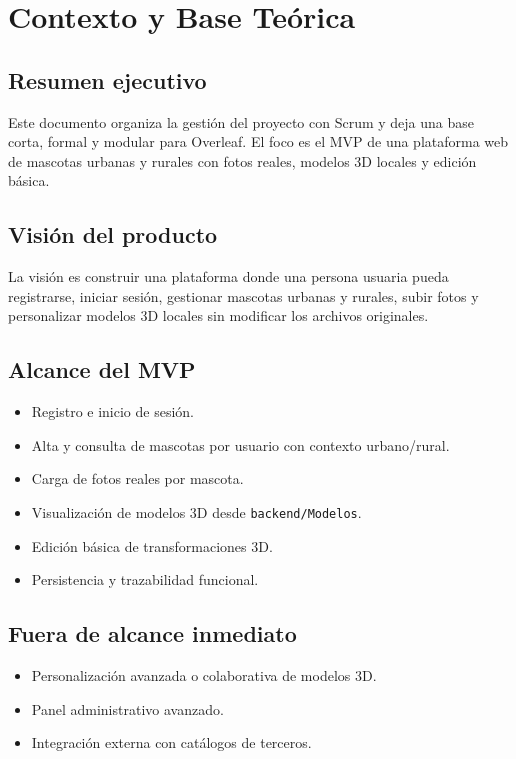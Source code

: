 \section{Contexto y Base Te\'orica}
\subsection{Resumen ejecutivo}
Este documento organiza la gesti\'on del proyecto con Scrum y deja una base corta, formal y modular para Overleaf. El foco es el MVP de una plataforma web de mascotas urbanas y rurales con fotos reales, modelos 3D locales y edici\'on b\'asica.

\subsection{Visi\'on del producto}
La visi\'on es construir una plataforma donde una persona usuaria pueda registrarse, iniciar sesi\'on, gestionar mascotas urbanas y rurales, subir fotos y personalizar modelos 3D locales sin modificar los archivos originales.

\subsection{Alcance del MVP}
\begin{itemize}[leftmargin=*]
    \item Registro e inicio de sesi\'on.
    \item Alta y consulta de mascotas por usuario con contexto urbano/rural.
    \item Carga de fotos reales por mascota.
    \item Visualizaci\'on de modelos 3D desde \texttt{backend/Modelos}.
    \item Edici\'on b\'asica de transformaciones 3D.
    \item Persistencia y trazabilidad funcional.
\end{itemize}

\subsection{Fuera de alcance inmediato}
\begin{itemize}[leftmargin=*]
    \item Personalizaci\'on avanzada o colaborativa de modelos 3D.
    \item Panel administrativo avanzado.
    \item Integraci\'on externa con cat\'alogos de terceros.
\end{itemize}

